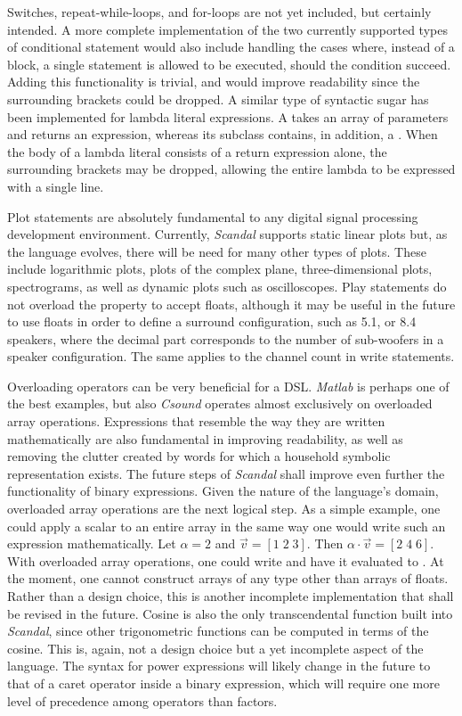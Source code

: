 Switches, repeat-while-loops, and for-loops are not yet included, but certainly intended. A more complete implementation of the two currently supported types of conditional statement would also include handling the cases where, instead of a block, a single statement is allowed to be executed, should the condition succeed. Adding this functionality is trivial, and would improve readability since the surrounding brackets could be dropped. A similar type of syntactic sugar has been implemented for lambda literal expressions. A  takes an array of parameters and returns an expression, whereas its subclass  contains, in addition, a . When the body of a lambda literal consists of a return expression alone, the surrounding brackets may be dropped, allowing the entire lambda to be expressed with a single line.

Plot statements are absolutely fundamental to any digital signal processing development environment. Currently, \emph{Scandal} supports static linear plots but, as the language evolves, there will be need for many other types of plots. These include logarithmic plots, plots of the complex plane, three-dimensional plots, spectrograms, as well as dynamic plots such as oscilloscopes. Play statements do not overload the  property to accept floats, although it may be useful in the future to use floats in order to define a surround configuration, such as 5.1, or 8.4 speakers, where the decimal part corresponds to the number of sub-woofers in a speaker configuration. The same applies to the channel count in write statements.

Overloading operators can be very beneficial for a DSL. \emph{Matlab} is perhaps one of the best examples, but also \emph{Csound} operates almost exclusively on overloaded array operations. Expressions that resemble the way they are written mathematically are also fundamental in improving readability, as well as removing the clutter created by words for which a household symbolic representation exists. The future steps of \emph{Scandal} shall improve even further the functionality of binary expressions. Given the nature of the language's domain, overloaded array operations are the next logical step. As a simple example, one could apply a scalar to an entire array in the same way one would write such an expression mathematically. Let $\alpha = 2$ and $\vec{v} = [1 \; 2 \; 3]$. Then $\alpha \cdot \vec{v} = [2 \; 4 \; 6]$. With overloaded array operations, one could write  and have it evaluated to \il{[2, 4, 6]}. At the moment, one cannot construct arrays of any type other than arrays of floats. Rather than a design choice, this is another incomplete implementation that shall be revised in the future. Cosine is also the only transcendental function built into \emph{Scandal}, since other trigonometric functions can be computed in terms of the cosine. This is, again, not a design choice but a yet incomplete aspect of the language. The syntax for power expressions will likely change in the future to that of a caret operator inside a binary expression, which will require one more level of precedence among operators than factors.

